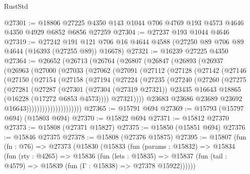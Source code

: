 \begin{lexlean}{RustStd}
\begin{coremodule}
@27301 := @18806 @27225 @4350 @143 @1044 @706 @4769 @193 @4573 @4646 @4350 @4929 @6852 @6856 @27259
@27304 := @27237 @193 @1044 @4646
@27319 := @27242
    @191
    @121
    @706
    @16
    @4644
    @4588
    (@27250 @89 @706 @89 @4644 (@16393 (@27255 @89)) @16678)
@27321 := @16239 @27225 @4350
@27364 := @26652
    (@26713
      (@26764
        (@26807
          (@26847
            (@26893
              (@26937
                (@26963
                  (@27000
                    (@27033
                      (@27062
                        (@27091
                          (@27112
                            (@27128
                              (@27142
                                (@27146
                                  (@27150
                                    (@27154
                                      (@27158
                                        (@27194
                                          (@27224
                                            (@27235
                                              (@27240
                                                (@27260
                                                  (@27275
                                                    (@27281
                                                      (@27287
                                                        (@27301
                                                          (@27304 (@27319 @27321))
                                                          @23435
                                                          @16643
                                                          @18865
                                                          (@16228 (@17272 @6853 @4573))))
                                                      @27321))))
                                              @23683
                                              @23686
                                              @23689
                                              @23692
                                              @16643)))))))))))))))))))))
@27365 := @15791 @694
@27369 := @15793 (@15797 @694) (@15803 @694)
@27370 := @15822 @694
@27371 := @15812 @27370
@27373 := @15808 (@27371 @15827)
@27375 := @15850 (@15851 @694)
@27376 := @15846 @27375
@27378 := @15808 (@27376 @15875)
@27395 := @15807
    (fun (fn : @76) =>
    @27373
      (@15830
        (@15833
          (fun (params : @15832) =>
          @15834
            (fun (rty : @4265) =>
            @15836
              (fun (lets : @15835) =>
              @15837 (fun (tail : @4579) => @15839 (fun (Γ : @15838) => @27378 @15922))))))

\end{coremodule}
\end{lexlean}
